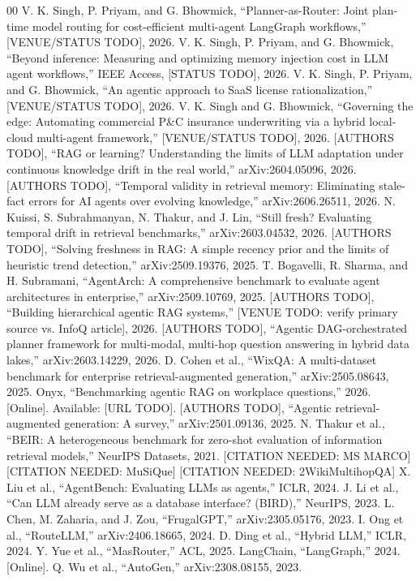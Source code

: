 \documentclass{ieeeaccess}
\begin{document}
\begin{thebibliography}{00}
 V. K. Singh, P. Priyam, and G. Bhowmick, ``Planner-as-Router:
Joint plan-time model routing for cost-efficient multi-agent LangGraph
workflows,'' [VENUE/STATUS TODO], 2026.
 V. K. Singh, P. Priyam, and G. Bhowmick, ``Beyond inference:
Measuring and optimizing memory injection cost in LLM agent workflows,''
IEEE Access, [STATUS TODO], 2026.
 V. K. Singh, P. Priyam, and G. Bhowmick, ``An agentic
approach to SaaS license rationalization,'' [VENUE/STATUS TODO], 2026.
 V. K. Singh and G. Bhowmick, ``Governing the edge: Automating
commercial P\&C insurance underwriting via a hybrid local-cloud multi-agent
framework,'' [VENUE/STATUS TODO], 2026.
 [AUTHORS TODO], ``RAG or learning? Understanding the limits
of LLM adaptation under continuous knowledge drift in the real world,''
arXiv:2604.05096, 2026.
 [AUTHORS TODO], ``Temporal validity in retrieval memory:
Eliminating stale-fact errors for AI agents over evolving knowledge,''
arXiv:2606.26511, 2026.
 N. Kuissi, S. Subrahmanyan, N. Thakur, and J. Lin,
``Still fresh? Evaluating temporal drift in retrieval benchmarks,''
arXiv:2603.04532, 2026.
 [AUTHORS TODO], ``Solving freshness in RAG: A simple recency
prior and the limits of heuristic trend detection,'' arXiv:2509.19376, 2025.
 T. Bogavelli, R. Sharma, and H. Subramani, ``AgentArch: A
comprehensive benchmark to evaluate agent architectures in enterprise,''
arXiv:2509.10769, 2025.
 [AUTHORS TODO], ``Building hierarchical agentic RAG
systems,'' [VENUE TODO: verify primary source vs. InfoQ article], 2026.
 [AUTHORS TODO], ``Agentic DAG-orchestrated planner framework
for multi-modal, multi-hop question answering in hybrid data lakes,''
arXiv:2603.14229, 2026.
 D. Cohen et al., ``WixQA: A multi-dataset benchmark for
enterprise retrieval-augmented generation,'' arXiv:2505.08643, 2025.
 Onyx, ``Benchmarking agentic RAG on workplace questions,''
2026. [Online]. Available: [URL TODO].
 [AUTHORS TODO], ``Agentic retrieval-augmented generation:
A survey,'' arXiv:2501.09136, 2025.
 N. Thakur et al., ``BEIR: A heterogeneous benchmark for
zero-shot evaluation of information retrieval models,'' NeurIPS Datasets,
2021.
 [CITATION NEEDED: MS MARCO]
 [CITATION NEEDED: MuSiQue]
 [CITATION NEEDED: 2WikiMultihopQA]
 X. Liu et al., ``AgentBench: Evaluating LLMs as agents,''
ICLR, 2024.
 J. Li et al., ``Can LLM already serve as a database interface?
(BIRD),'' NeurIPS, 2023.
 L. Chen, M. Zaharia, and J. Zou, ``FrugalGPT,''
arXiv:2305.05176, 2023.
 I. Ong et al., ``RouteLLM,'' arXiv:2406.18665, 2024.
 D. Ding et al., ``Hybrid LLM,'' ICLR, 2024.
 Y. Yue et al., ``MasRouter,'' ACL, 2025.
 LangChain, ``LangGraph,'' 2024. [Online].
 Q. Wu et al., ``AutoGen,'' arXiv:2308.08155, 2023.
\end{thebibliography}
\end{document}
